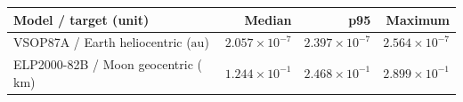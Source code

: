 \begin{tabularx}{\columnwidth}{@{}Yrrr@{}}
\toprule
Model / target (unit) & Median & p95 & Maximum \\
\midrule
VSOP87A / Earth heliocentric ($\mathrm{au}$) & $2.057\times10^{-7}$ & $2.397\times10^{-7}$ & $2.564\times10^{-7}$ \\
ELP2000-82B / Moon geocentric ($\mathrm{km}$) & $1.244\times10^{-1}$ & $2.468\times10^{-1}$ & $2.899\times10^{-1}$ \\
\bottomrule
\end{tabularx}
